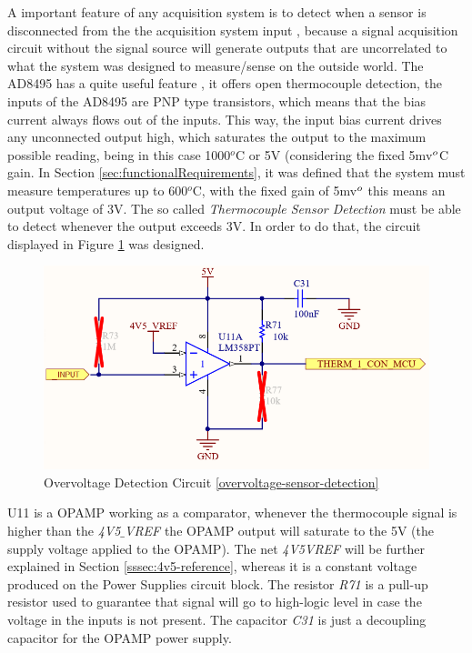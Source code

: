 	A important feature of any acquisition system is to detect when a sensor is disconnected from the the acquisition system input \cite{o2011pressure}, because a signal acquisition circuit without the signal source will generate outputs that are uncorrelated to what the system was designed to measure/sense on the outside world. The AD8495 has a quite useful feature \cite{ad8495-datasheet}, it offers open thermocouple detection, the inputs of the AD8495 are PNP type transistors, which means that the bias current always flows out of the inputs. This way, the input bias current drives any unconnected output high, which saturates the output to the maximum possible reading, being in this case 1000$^{o}$C or 5V (considering the fixed 5mv$\/ ^{o}$C gain. In Section \ref{sec:functionalRequirements}, it was defined that the system must measure temperatures up to 600$^{o}$C, with the fixed gain of 5mv$\/^{o}$ this means an output voltage of 3V. The so called \textit{Thermocouple Sensor Detection} must be able to detect whenever the output exceeds 3V. In order to do that, the circuit displayed in Figure \ref{fig:overvoltage-sensor-detection} was designed.
	
		\begin{figure}[htbp]
			\centering
				\includegraphics[scale=1]{figuras/fig-overvoltage-sensor-detection}
			\caption{Overvoltage Detection Circuit \ref{overvoltage-sensor-detection}}
			\label{fig:overvoltage-sensor-detection}
		\end{figure}
		
	U11 is a OPAMP working as a comparator, whenever the thermocouple signal is higher than the \textit{4V5$\_$VREF} the OPAMP output will saturate to the 5V (the supply voltage applied to the OPAMP). The net \textit{4V5\textunderscore VREF} will be further explained in Section \ref{sssec:4v5-reference}, whereas it is a constant voltage produced on the Power Supplies circuit block. The resistor \textit{R71} is a pull-up resistor used to guarantee that signal will go to high-logic level in case the voltage in the inputs is not present. The capacitor \textit{C31} is just a decoupling capacitor for the OPAMP power supply.

